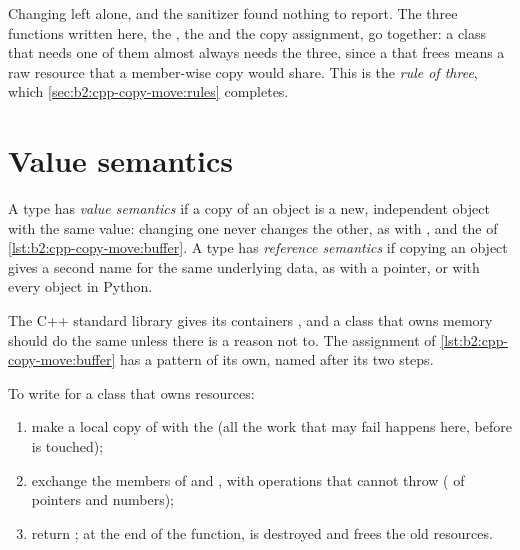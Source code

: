 Changing  left  alone, and the sanitizer found nothing to report. The three functions written here,
the , the  and the copy assignment, go together: a class that needs one of them almost
always needs the three, since a  that frees means a raw resource that a member-wise copy would share.
This is the \emph{rule of three}, which \cref{sec:b2:cpp-copy-move:rules} completes.

\section{Value semantics}\label{sec:b2:cpp-copy-move:value}

\begin{definition}\label{def:b2:cpp-copy-move:value-semantics}
A type has \emph{value semantics} if a copy of an object is a new, independent object with
the same value: changing one never changes the other, as with ,  and the
 of \cref{lst:b2:cpp-copy-move:buffer}. A type has \emph{reference semantics} if copying an object gives a second name for the same underlying data, as with a pointer, or with every
object in Python.
\end{definition}

The C++ standard library gives its containers , and a class that owns memory should do the same
unless there is a reason not to. The assignment of \cref{lst:b2:cpp-copy-move:buffer} has a pattern of its own,
named after its two steps.

\begin{method}\label{met:b2:cpp-copy-move:copy-and-swap}
To write  for a class that owns resources:
\begin{enumerate}
\item make a local copy  of  with the  (all the work that may fail happens here,
before  is touched);
\item exchange the members of  and , with operations that cannot throw ( of
pointers and numbers);
\item return ; at the end of the function,  is destroyed and frees the old resources.
\end{enumerate}
\end{method}

